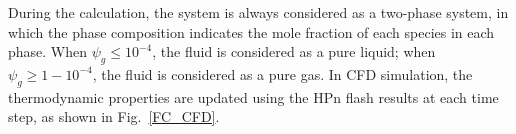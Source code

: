 {    %

    During the calculation, the system is always considered as a two-phase system, in which the phase composition indicates the mole fraction of each species in each phase. When $\psi_g \leq10^{-4}$, the fluid is considered as a pure liquid; when $\psi_g \geq 1-10^{-4}$, the fluid is considered as a pure gas. %
    In CFD simulation, the thermodynamic properties are updated using the HPn flash results at each time step, as shown in Fig.~\ref{FC_CFD}.
    
}
